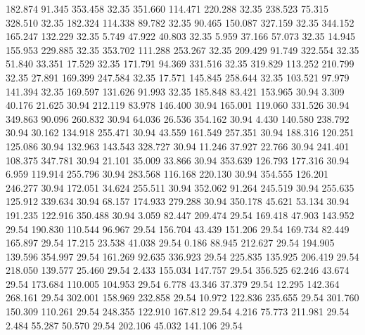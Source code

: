  182.874   91.345  353.458        32.35
 351.660  114.471  220.288        32.35
 238.523   75.315  328.510        32.35
 182.324  114.338   89.782        32.35
  90.465  150.087  327.159        32.35
 344.152  165.247  132.229        32.35
   5.749   47.922   40.803        32.35
   5.959   37.166   57.073        32.35
  14.945  155.953  229.885        32.35
 353.702  111.288  253.267        32.35
 209.429   91.749  322.554        32.35
  51.840   33.351   17.529        32.35
 171.791   94.369  331.516        32.35
 319.829  113.252  210.799        32.35
  27.891  169.399  247.584        32.35
  17.571  145.845  258.644        32.35
 103.521   97.979  141.394        32.35
 169.597  131.626   91.993        32.35
 185.848   83.421  153.965        30.94
   3.309   40.176   21.625        30.94
 212.119   83.978  146.400        30.94
 165.001  119.060  331.526        30.94
 349.863   90.096  260.832        30.94
  64.036   26.536  354.162        30.94
   4.430  140.580  238.792        30.94
  30.162  134.918  255.471        30.94
  43.559  161.549  257.351        30.94
 188.316  120.251  125.086        30.94
 132.963  143.543  328.727        30.94
  11.246   37.927   22.766        30.94
 241.401  108.375  347.781        30.94
  21.101   35.009   33.866        30.94
 353.639  126.793  177.316        30.94
   6.959  119.914  255.796        30.94
 283.568  116.168  220.130        30.94
 354.555  126.201  246.277        30.94
 172.051   34.624  255.511        30.94
 352.062   91.264  245.519        30.94
 255.635  125.912  339.634        30.94
  68.157  174.933  279.288        30.94
 350.178   45.621   53.134        30.94
 191.235  122.916  350.488        30.94
   3.059   82.447  209.474        29.54
 169.418   47.903  143.952        29.54
 190.830  110.544   96.967        29.54
 156.704   43.439  151.206        29.54
 169.734   82.449  165.897        29.54
  17.215   23.538   41.038        29.54
   0.186   88.945  212.627        29.54
 194.905  139.596  354.997        29.54
 161.269   92.635  336.923        29.54
 225.835  135.925  206.419        29.54
 218.050  139.577   25.460        29.54
   2.433  155.034  147.757        29.54
 356.525   62.246   43.674        29.54
 173.684  110.005  104.953        29.54
   6.778   43.346   37.379        29.54
  12.295  142.364  268.161        29.54
 302.001  158.969  232.858        29.54
  10.972  122.836  235.655        29.54
 301.760  150.309  110.261        29.54
 248.355  122.910  167.812        29.54
   4.216   75.773  211.981        29.54
   2.484   55.287   50.570        29.54
 202.106   45.032  141.106        29.54
